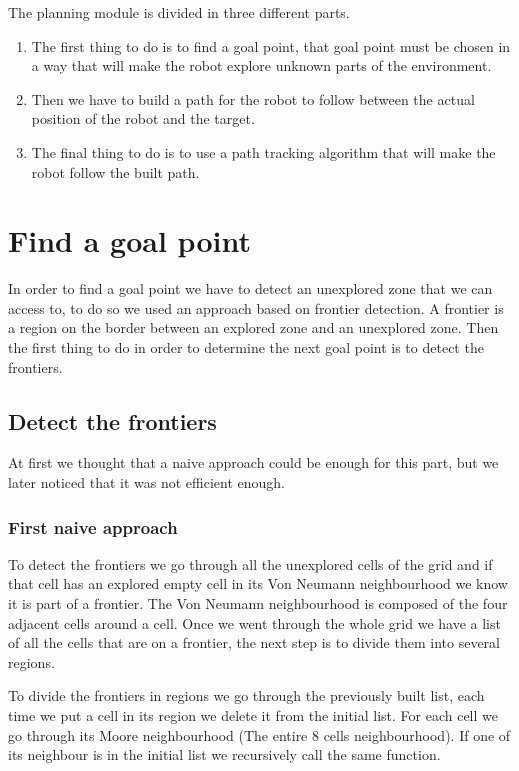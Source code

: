 The planning module is divided in three different parts.

\begin{enumerate}
    \item The first thing to do is to find a goal point, that goal point must be chosen in a way that will make the robot explore unknown parts of the environment.
    \item Then we have to build a path for the robot to follow between the actual position of the robot and the target.
    \item The final thing to do is to use a path tracking algorithm that will make the robot follow the built path.
\end{enumerate}

\section{Find a goal point}

In order to find a goal point we have to detect an unexplored zone that we can access to, to do so we used an approach based on frontier detection.
A frontier is a region on the border between an explored zone and an unexplored zone.
Then the first thing to do in order to determine the next goal point is to detect the frontiers.

\subsection{Detect the frontiers}

At first we thought that a naive approach could be enough for this part, but we later noticed that it was not efficient enough.

\subsubsection{First naive approach}

To detect the frontiers we go through all the unexplored cells of the grid and if that cell has an explored empty cell in its Von Neumann neighbourhood we know it is part of a frontier.
The Von Neumann neighbourhood is composed of the four adjacent cells around a cell.
Once we went through the whole grid we have a list of all the cells that are on a frontier, the next step is to divide them into several regions.

To divide the frontiers in regions we go through the previously built list, each time we put a cell in its region we delete it from the initial list.
For each cell we go through its Moore neighbourhood (The entire 8 cells neighbourhood).
If one of its neighbour is in the initial list we recursively call the same function.

